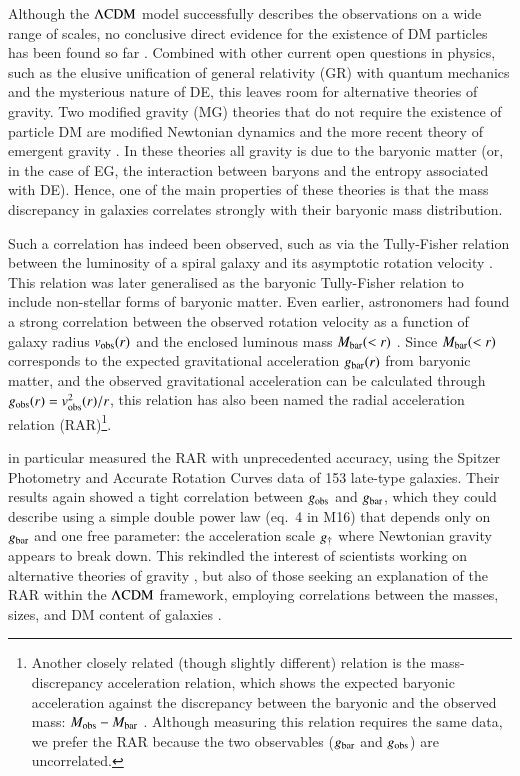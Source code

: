\documentclass{aa}
\newcommand{\lcdm}{{\rm \Lambda CDM}}
\newcommand{\un}[1]{_{\rm #1}}
\begin{document}
Although the $\lcdm$ model successfully describes the observations on a wide range of scales, no conclusive direct evidence for the existence of DM particles has been found so far \cite[despite years of enormous effort; for an overview, see][]{bertone2005,bertone2018}. Combined with other current open questions in physics, such as the elusive unification of general relativity (GR) with quantum mechanics and the mysterious nature of DE, this leaves room for alternative theories of gravity. Two modified gravity (MG) theories that do not require the existence of particle DM are modified Newtonian dynamics \cite[MOND;][]{milgrom1983} and the more recent theory of emergent gravity \cite[EG;][]{verlinde2017}. In these theories all gravity is due to the baryonic matter (or, in the case of EG, the interaction between baryons and the entropy associated with DE). Hence, one of the main properties of these theories is that the mass discrepancy in galaxies correlates strongly with their baryonic mass distribution.

Such a correlation has indeed been observed, such as via the Tully-Fisher relation \cite[]{tully1977} between the luminosity of a spiral galaxy and its asymptotic rotation velocity \cite[]{pierce1988,bernstein1994}. This relation was later generalised as the baryonic Tully-Fisher relation \cite[]{mcgaugh2000,mcgaugh2012} to include non-stellar forms of baryonic matter. Even earlier, astronomers had found a strong correlation between the observed rotation velocity as a function of galaxy radius $v\un{obs}(r)$ and the enclosed luminous mass $M\un{bar}(<r)$ \cite[]{sanders1986,sanders1996,mcgaugh2004,sanders2007,wu2015}. Since $M\un{bar}(<r)$ corresponds to the expected gravitational acceleration $g\un{bar}(r)$ from baryonic matter, and the observed gravitational acceleration can be calculated through $g\un{obs}(r)=v\un{obs}^2(r)/r$, this relation has also been named the radial acceleration relation (RAR)\footnote{Another closely related (though slightly different) relation is the mass-discrepancy acceleration relation, which shows the expected baryonic acceleration against the discrepancy between the baryonic and the observed mass: $M\un{obs}-M\un{bar}$ \cite[see][]{mcgaugh2004}. Although measuring this relation requires the same data, we prefer the RAR because the two observables ($g\un{bar}$ and $g\un{obs}$) are uncorrelated.}.

\citet[][hereafter M16]{mcgaugh2016} in particular measured the RAR with unprecedented accuracy, using the Spitzer Photometry and Accurate Rotation Curves \cite[SPARC;][]{lelli2016b} data of 153 late-type galaxies. Their results again showed a tight correlation between $g\un{obs}$ and $g\un{bar}$, which they could describe using a simple double power law (eq.~4 in M16) that depends only on $g\un{bar}$ and one free parameter: the acceleration scale $g\un{\dagger}$ where Newtonian gravity appears to break down. This rekindled the interest of scientists working on alternative theories of gravity \cite[]{lelli2017a,lelli2017b,burrage2017,li2018,obrien2019}, but also of those seeking an explanation of the RAR within the $\lcdm$ framework, employing correlations between the masses, sizes, and DM content of galaxies \cite[]{dicintio2016,keller2017,desmond2017,ludlow2017, navarro2017,tenneti2018}.
\end{document}
